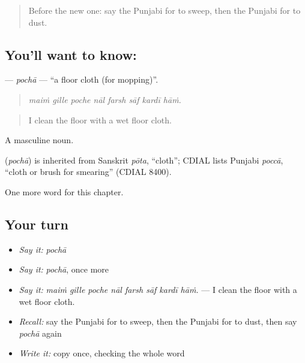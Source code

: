 \label{lesson:PA-C235-pocha}



\begin{quote}
Before the new one: say the Punjabi for to sweep, then the Punjabi for to dust.
\end{quote}

\subsection*{You'll want to know: }
\textbf{} — \emph{pochā} — \textquotedblleft{}a floor cloth (for mopping)\textquotedblright{}.

\begin{quote}
       
\end{quote}

\begin{quote}
\emph{maiṁ gille poche nāl farsh sāf kardī hāṁ.}
\end{quote}

\begin{quote}
I clean the floor with a wet floor cloth.
\end{quote}

A masculine noun.

\begin{cousinweb}
\textbf{} (\emph{pochā}) is inherited from Sanskrit \emph{pōta}, \textquotedblleft{}cloth\textquotedblright{}; CDIAL lists Punjabi \emph{poccā}, \textquotedblleft{}cloth or brush for smearing\textquotedblright{} (CDIAL 8400).
\end{cousinweb}

\begin{grammarlens}[title={What you've built}]
One more word for this chapter.
\end{grammarlens}

\subsection*{Your turn}
\begin{itemize}
\raggedright
  \item \emph{Say it:} \emph{pochā}
  \item \emph{Say it:} \emph{pochā}, once more
  \item \emph{Say it:} \emph{maiṁ gille poche nāl farsh sāf kardī hāṁ.} — I clean the floor with a wet floor cloth.
  \item \emph{Recall:} say the Punjabi for to sweep, then the Punjabi for to dust, then say \emph{pochā} again
  \item \emph{Write it:} copy \textbf{} once, checking the whole word
\end{itemize}


